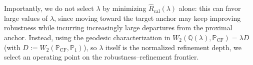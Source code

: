 


\iffalse
Importantly, we do not select $\lambda$ by minimizing $\widehat{R}_{\mathrm{cal}}(\lambda)$ alone:
this can favor large values of $\lambda$, since moving toward the target anchor may keep improving robustness while incurring increasingly large departures from the proximal anchor. 
Instead, using the geodesic characterization in $W_2\!\left(
\mathbb{Q}(\lambda),
\mathbb{P}_{\mathrm{CF}}
\right)
=
\lambda D$ (with $D
:=
W_2(\mathbb{P}_{\mathrm{CF}},\mathbb{P}_1)$), 
so $\lambda$ itself is the normalized refinement depth, we select an operating point on the
robustness--refinement frontier.

